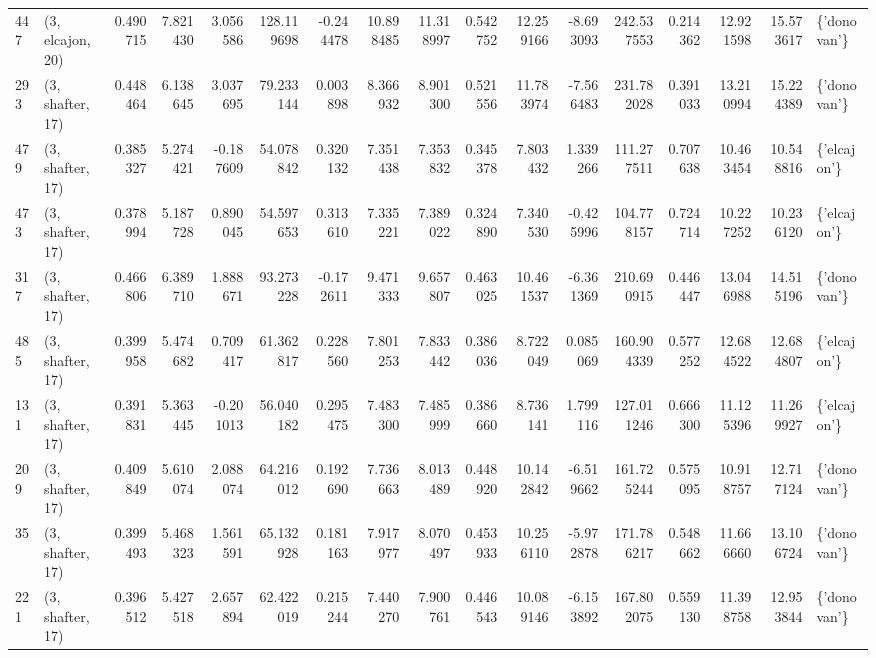 \begin{tabular}{llrrrrrrrrrrrrrrl}
447 &  (3, elcajon, 20) &   0.490715 &   7.821430 &   3.056586 &   128.119698 &  -0.244478 &  10.898485 &  11.318997 &  0.542752 &  12.259166 &  -8.693093 &   242.537553 &   0.214362 &  12.921598 &  15.573617 &  \{'donovan'\} \\
293 &  (3, shafter, 17) &   0.448464 &   6.138645 &   3.037695 &    79.233144 &   0.003898 &   8.366932 &   8.901300 &  0.521556 &  11.783974 &  -7.566483 &   231.782028 &   0.391033 &  13.210994 &  15.224389 &  \{'donovan'\} \\
479 &  (3, shafter, 17) &   0.385327 &   5.274421 &  -0.187609 &    54.078842 &   0.320132 &   7.351438 &   7.353832 &  0.345378 &   7.803432 &   1.339266 &   111.277511 &   0.707638 &  10.463454 &  10.548816 &  \{'elcajon'\} \\
473 &  (3, shafter, 17) &   0.378994 &   5.187728 &   0.890045 &    54.597653 &   0.313610 &   7.335221 &   7.389022 &  0.324890 &   7.340530 &  -0.425996 &   104.778157 &   0.724714 &  10.227252 &  10.236120 &  \{'elcajon'\} \\
317 &  (3, shafter, 17) &   0.466806 &   6.389710 &   1.888671 &    93.273228 &  -0.172611 &   9.471333 &   9.657807 &  0.463025 &  10.461537 &  -6.361369 &   210.690915 &   0.446447 &  13.046988 &  14.515196 &  \{'donovan'\} \\
485 &  (3, shafter, 17) &   0.399958 &   5.474682 &   0.709417 &    61.362817 &   0.228560 &   7.801253 &   7.833442 &  0.386036 &   8.722049 &   0.085069 &   160.904339 &   0.577252 &  12.684522 &  12.684807 &  \{'elcajon'\} \\
131 &  (3, shafter, 17) &   0.391831 &   5.363445 &  -0.201013 &    56.040182 &   0.295475 &   7.483300 &   7.485999 &  0.386660 &   8.736141 &   1.799116 &   127.011246 &   0.666300 &  11.125396 &  11.269927 &  \{'elcajon'\} \\
209 &  (3, shafter, 17) &   0.409849 &   5.610074 &   2.088074 &    64.216012 &   0.192690 &   7.736663 &   8.013489 &  0.448920 &  10.142842 &  -6.519662 &   161.725244 &   0.575095 &  10.918757 &  12.717124 &  \{'donovan'\} \\
35  &  (3, shafter, 17) &   0.399493 &   5.468323 &   1.561591 &    65.132928 &   0.181163 &   7.917977 &   8.070497 &  0.453933 &  10.256110 &  -5.972878 &   171.786217 &   0.548662 &  11.666660 &  13.106724 &  \{'donovan'\} \\
221 &  (3, shafter, 17) &   0.396512 &   5.427518 &   2.657894 &    62.422019 &   0.215244 &   7.440270 &   7.900761 &  0.446543 &  10.089146 &  -6.153892 &   167.802075 &   0.559130 &  11.398758 &  12.953844 &  \{'donovan'\} \\

\end{tabular}
